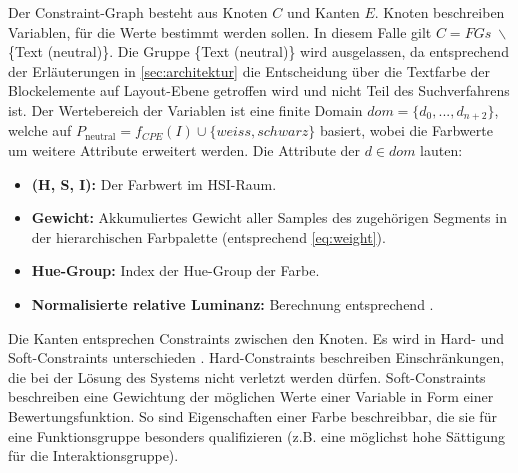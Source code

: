 Der Constraint-Graph besteht aus Knoten $C$ und Kanten $E$. Knoten beschreiben Variablen, für die Werte bestimmt werden sollen. In diesem Falle gilt $C = FGs\; \backslash$ \{Text (neutral)\}. Die Gruppe \{Text (neutral)\} wird ausgelassen, da entsprechend der Erläuterungen in \autoref{sec:architektur} die Entscheidung über die Textfarbe der Blockelemente auf Layout-Ebene  getroffen wird und nicht Teil des Suchverfahrens ist. Der Wertebereich der Variablen ist eine finite Domain $dom = \{d_0, ..., d_{n+2}\}$, welche auf $P_\text{neutral} = f_{CPE}(I) \cup \{weiss, schwarz\}$ basiert, wobei die Farbwerte um weitere Attribute erweitert werden. Die Attribute der $d \in dom$ lauten:

\begin{itemize}
	\item \textbf{(H, S, I):} Der Farbwert im HSI-Raum.
	\item \textbf{Gewicht:} Akkumuliertes Gewicht aller Samples des zugehörigen Segments in der hierarchischen Farbpalette (entsprechend \autoref{eq:weight}).
	\item \textbf{Hue-Group:} Index der Hue-Group der Farbe.
	\item \textbf{Normalisierte relative Luminanz:} Berechnung entsprechend \citet{wcag-rel-luminance}.
\end{itemize}

Die Kanten entsprechen Constraints zwischen den Knoten. Es wird in Hard- und Soft-Constraints unterschieden \citep{patterns}. Hard-Constraints beschreiben Einschränkungen, die bei der Lösung des Systems nicht verletzt werden dürfen. Soft-Constraints beschreiben eine Gewichtung der möglichen Werte einer Variable in Form einer Bewertungsfunktion. So sind Eigenschaften einer Farbe beschreibbar, die sie für eine Funktionsgruppe besonders qualifizieren (z.B. eine möglichst hohe Sättigung für die Interaktionsgruppe).

